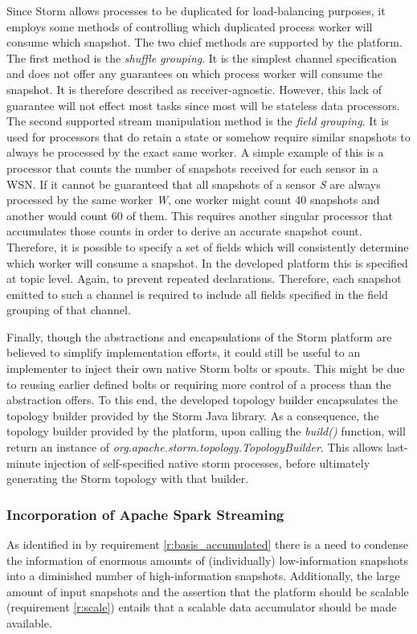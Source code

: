 

Since Storm allows processes to be duplicated for load-balancing purposes, it employs some methods of controlling which duplicated process worker will consume which snapshot. The two chief methods are supported by the platform. The first method is the \emph{shuffle grouping}. It is the simplest channel specification and does not offer any guarantees on which process worker will consume the snapshot. It is therefore described as receiver-agnostic. However, this lack of guarantee will not effect most tasks since most will be stateless data processors. The second supported stream manipulation method is the \emph{field grouping}. It is used for processors that do retain a state or somehow require similar snapshots to always be processed by the exact same worker. A simple example of this is a processor that counts the number of snapshots received for each sensor in a WSN. If it cannot be guaranteed that all snapshots of a sensor \emph{S} are always processed by the same worker \emph{W}, one worker might count 40 snapshots and another would count 60 of them. This requires another singular processor that accumulates those counts in order to derive an accurate snapshot count. Therefore, it is possible to specify a set of fields which will consistently determine which worker will consume a snapshot. In the developed platform this is specified at topic level. Again, to prevent repeated declarations. Therefore, each snapshot emitted to such a channel is required to include all fields specified in the field grouping of that channel.

Finally, though the abstractions and encapsulations of the Storm platform are believed to simplify implementation efforts, it could still be useful to an implementer to inject their own native Storm bolts or spouts. This might be due to reusing earlier defined bolts or requiring more control of a process than the abstraction offers. To this end, the developed topology builder encapsulates the topology builder provided by the Storm Java library. As a consequence, the topology builder provided by the platform, upon calling the \emph{build()} function, will return an instance of \emph{org.apache.storm.topology.TopologyBuilder}. This allows last-minute injection of self-specified native storm processes, before ultimately generating the Storm topology with that builder.

\subsubsection*{Incorporation of Apache Spark Streaming}
\label{sec:incorporation_spark}
As identified in by requirement \ref{r:basis_accumulated} there is a need to condense the information of enormous amounts of (individually) low-information snapshots into a diminished number of high-information snapshots. Additionally, the large amount of input snapshots and the assertion that the platform should be scalable (requirement \ref{r:scale}) entails that a scalable data accumulator should be made available.

